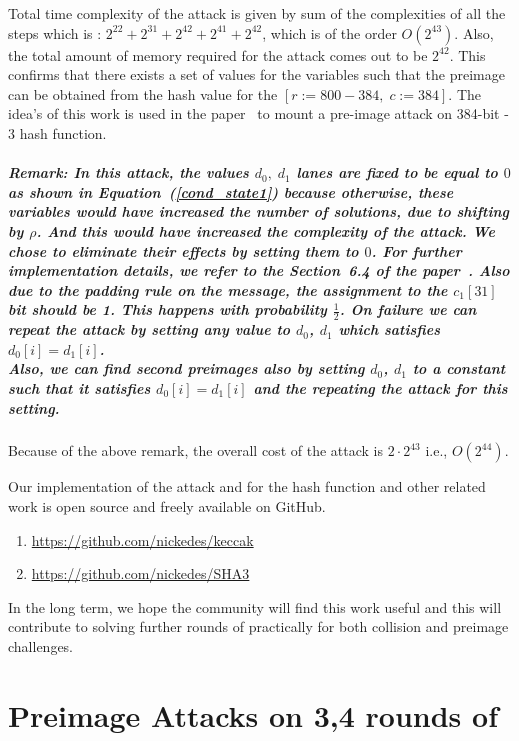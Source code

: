 Total time complexity of the attack is given by sum of the complexities of all the steps which is : $2^{22} + 2^{31} + 2^{42} + 2^{41} + 2^{42}$, which is of the order $O(2^{43})$.
Also, the total amount of memory required for the attack comes out to be $2^{42}$. 
This confirms that there exists a set of values for the variables such that the preimage can be obtained from the hash value for the \KECCAK{}$[r:=800-384,\; c:=384]$. The idea's of this work is used in the paper~\cite{rns2018} to mount a pre-image attack on 384-bit \SHA-$3$ hash function.


\paragraph{Remark:
In this attack, the values $d_0,\;d_1$ lanes are fixed to be equal to $0$ as shown in Equation~(\ref{cond_state1}) because otherwise, these variables would have increased the number of solutions, due to shifting by $\rho$. 
And this would have increased the complexity of the attack. We chose to eliminate their effects by setting them to $0$. For further implementation details, we refer to the Section~6.4 of the paper~\cite{naya2011practical}. Also due to the padding rule on the message, the assignment to the $c_1[31]$ bit should be 1. This happens with probability $\tfrac{1}{2}$. On failure we can repeat the attack by setting any value to $d_0$, $d_1$ which satisfies $d_0[i]=d_1[i]$. \\
Also, we can find second preimages also by setting $d_0$, $d_1$ to a constant such that it satisfies $d_0[i]=d_1[i]$ and the repeating the attack for this setting.
}

Because of the above remark, the overall cost of the attack is $2\cdot 2^{43}$ i.e., $O(2^{44})$.

Our implementation of the attack and for the hash function and other related work is open source and freely available on GitHub.

\begin{enumerate}
    \item \url{https://github.com/nickedes/keccak}
    \item \url{https://github.com/nickedes/SHA3}
\end{enumerate}

In the long term, we hope the community will find this work useful and this will contribute to solving further rounds of \KECCAK{} practically for both collision and preimage challenges.

\chapter{Preimage Attacks on 3,4 rounds of \KECCAK{}}

